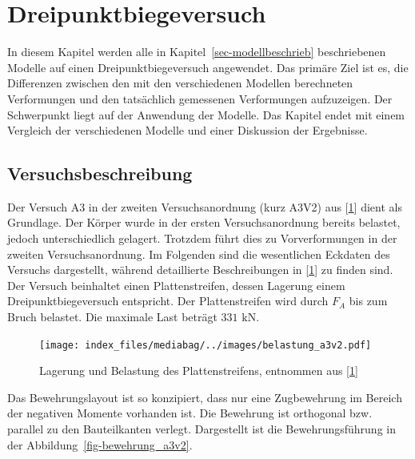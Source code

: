 \documentclass[
  12pt,
  letterpaper,
  egregdoesnotlikesansseriftitles]{scrreprt}
\begin{document}

\hypertarget{sec-dreipunkt}{%
\chapter{Dreipunktbiegeversuch}\label{sec-dreipunkt}}

In diesem Kapitel werden alle in Kapitel~\ref{sec-modellbeschrieb}
beschriebenen Modelle auf einen Dreipunktbiegeversuch angewendet. Das
primäre Ziel ist es, die Differenzen zwischen den mit den verschiedenen
Modellen berechneten Verformungen und den tatsächlich gemessenen
Verformungen aufzuzeigen. Der Schwerpunkt liegt auf der Anwendung der
Modelle. Das Kapitel endet mit einem Vergleich der verschiedenen Modelle
und einer Diskussion der Ergebnisse.

\hypertarget{versuchsbeschreibung}{%
\section{Versuchsbeschreibung}\label{versuchsbeschreibung}}

Der Versuch A3 in der zweiten Versuchsanordnung (kurz A3V2) aus
{[}\protect\hyperlink{ref-Jaeger2006}{1}{]} dient als Grundlage. Der
Körper wurde in der ersten Versuchsanordnung bereits belastet, jedoch
unterschiedlich gelagert. Trotzdem führt dies zu Vorverformungen in der
zweiten Versuchsanordnung. Im Folgenden sind die wesentlichen Eckdaten
des Versuchs dargestellt, während detaillierte Beschreibungen in
{[}\protect\hyperlink{ref-Jaeger2006}{1}{]} zu finden sind. Der Versuch
beinhaltet einen Plattenstreifen, dessen Lagerung einem
Dreipunktbiegeversuch entspricht. Der Plattenstreifen wird durch \(F_A\)
bis zum Bruch belastet. Die maximale Last beträgt \(331 \text{ kN}\).

\begin{figure}[H]

{\centering \texttt{[image: index\_files/mediabag/../images/belastung\_a3v2.pdf]}

}

\caption{Lagerung und Belastung des Plattenstreifens, entnommen aus
{[}\protect\hyperlink{ref-Jaeger2006}{1}{]}}

\end{figure}

Das Bewehrungslayout ist so konzipiert, dass nur eine Zugbewehrung im
Bereich der negativen Momente vorhanden ist. Die Bewehrung ist
orthogonal bzw. parallel zu den Bauteilkanten verlegt. Dargestellt ist
die Bewehrungsführung in der Abbildung~\ref{fig-bewehrung_a3v2}.
\end{document}
